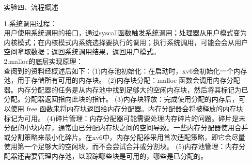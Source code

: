 \documentclass[12pt]{article}
\begin{document}
\begin{Large}
    \noindent 实验四、流程概述\\
\end{Large}
\noindent 1.系统调用过程：\\
\hspace*{2em}用户使用系统调用的接口，通过syscall函数触发系统调用；处理器从用户模式变为内核模式；在内核模式内系统选择要执行的调用；执行系统调用，可能会会从用户空间拿取数据；返回系统调用结果，返回用户模式。\\
\noindent 2.malloc的底层实现原理：\\
\hspace*{2em}查阅到的资料经概述后如下：(1)内存池初始化：在启动时，xv6会初始化一个内存池，用于存储所有可用的内存块。
(2)内存块分配：malloc 函数会调用内存分配器。内存分配器的任务是从内存池中找到足够大的空闲内存块，然后将其标记为已分配。分配器返回指向此块的指针。
(3)内存块释放：完成使用分配的内存后，可以使用 free 函数来将内存块返回给内存分配器。内存分配器会将被释放的内存块标记为可用。
(4)碎片管理：内存分配器可能需要处理内存碎片的问题。碎片是未分配的小块内存，通常由已分配内存块之间的空间导致。一些内存分配器使用合并或分割策略来最小化碎片。在xv6中，内存分配器采用首次适配策略，即它会尽量使用第一个足够大的空闲块，而不会尝试合并或分割块。
(5)内存池管理：内存分配器还需要管理内存池，以跟踪哪些块是可用的，哪些是已分配的。
\end{document}
